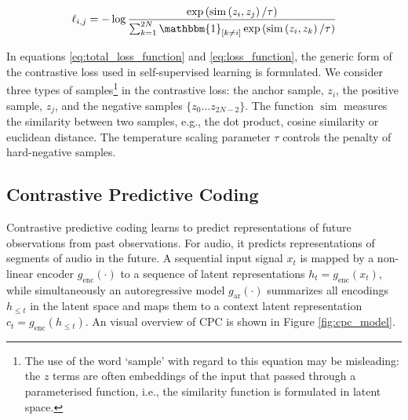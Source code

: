 \begin{equation}
    \ell_{i, j}=-\log \frac{\exp \left(\operatorname{sim}\left(z_{i}, z_{j}\right) / \tau\right)}{\sum_{k=1}^{2 N} \mathbbm{1}_{[k \neq i]} \exp \left(\operatorname{sim}\left(z_{i}, z_{k}\right) / \tau\right)}
    \label{eq:loss_function}
\end{equation}

In equations \ref{eq:total_loss_function} and \ref{eq:loss_function}, the generic form of the contrastive loss used in self-supervised learning is formulated.
We consider three types of samples\footnote{The use of the word `sample' with regard to this equation may be misleading: the $z$ terms are often embeddings of the input that passed through a parameterised function, i.e., the similarity function is formulated in latent space.} in the contrastive loss: the anchor sample, $z_i$, the positive sample, $z_j$, and the negative samples $\{ z_0 \dots z_{2N-2} \}$.
The function $\operatorname{sim}$ measures the similarity between two samples, e.g., the dot product, cosine similarity or euclidean distance.
The temperature scaling parameter $\tau$ controls the penalty of hard-negative samples.






\subsection{Contrastive Predictive Coding}\label{sec:cpc}

Contrastive predictive coding learns to predict representations of future observations from past observations.
For audio, it predicts representations of segments of audio in the future.
A sequential input signal $x_t$ is mapped by a non-linear encoder $g_{\mathrm{enc}}(\cdot)$ to a sequence of latent representations $h_t = g_{\mathrm{enc}}(x_t)$, while simultaneously an autoregressive model $g_{\mathrm{ar}}(\cdot)$ summarizes all encodings $h_{\leq t}$ in the latent space and maps them to a context latent representation $c_t = g_{\mathrm{enc}}(h_{\leq t})$. An visual overview of CPC is shown in Figure \ref{fig:cpc_model}.


